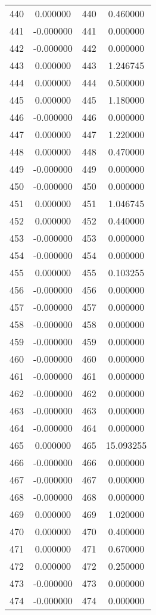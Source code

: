 \documentclass[12pt]{article}
\begin{document}
\begin{longtable}{@{}cccc@{}}
440 & 0.000000 & 440 & 0.460000 \\
441 & -0.000000 & 441 & 0.000000 \\
442 & -0.000000 & 442 & 0.000000 \\
443 & 0.000000 & 443 & 1.246745 \\
444 & 0.000000 & 444 & 0.500000 \\
445 & 0.000000 & 445 & 1.180000 \\
446 & -0.000000 & 446 & 0.000000 \\
447 & 0.000000 & 447 & 1.220000 \\
448 & 0.000000 & 448 & 0.470000 \\
449 & -0.000000 & 449 & 0.000000 \\
450 & -0.000000 & 450 & 0.000000 \\
451 & 0.000000 & 451 & 1.046745 \\
452 & 0.000000 & 452 & 0.440000 \\
453 & -0.000000 & 453 & 0.000000 \\
454 & -0.000000 & 454 & 0.000000 \\
455 & 0.000000 & 455 & 0.103255 \\
456 & -0.000000 & 456 & 0.000000 \\
457 & -0.000000 & 457 & 0.000000 \\
458 & -0.000000 & 458 & 0.000000 \\
459 & -0.000000 & 459 & 0.000000 \\
460 & -0.000000 & 460 & 0.000000 \\
461 & -0.000000 & 461 & 0.000000 \\
462 & -0.000000 & 462 & 0.000000 \\
463 & -0.000000 & 463 & 0.000000 \\
464 & -0.000000 & 464 & 0.000000 \\
465 & 0.000000 & 465 & 15.093255 \\
466 & -0.000000 & 466 & 0.000000 \\
467 & -0.000000 & 467 & 0.000000 \\
468 & -0.000000 & 468 & 0.000000 \\
469 & 0.000000 & 469 & 1.020000 \\
470 & 0.000000 & 470 & 0.400000 \\
471 & 0.000000 & 471 & 0.670000 \\
472 & 0.000000 & 472 & 0.250000 \\
473 & -0.000000 & 473 & 0.000000 \\
474 & -0.000000 & 474 & 0.000000 \\

\end{longtable}
\end{document}
